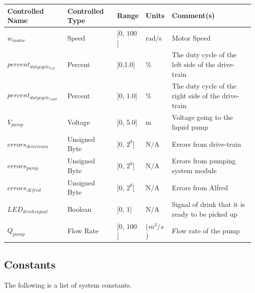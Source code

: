 \documentclass [10pt]{article}
\begin{document}
\begin{longtable}{|l|l|l|l|l|}\hline 
	\rowcolor{tableCell}\textbf{Controlled Name} & \textbf{Controlled Type} & \textbf{Range} & \textbf{Units} & \textbf{Comment(s)} \\ \hline
    $w_{motor}$ & Speed & [0, $ 100 $]& rad/s &  Motor Speed\\ \hline
    	\rowcolor{tableCell}$ percent_{dutycycle_{left}} $ & Percent & [0,1.0] & \% & The duty cycle of the left side of the drive-train \\ \hline
    $ percent_{dutycycle_{right}} $ & Percent & [0, 1.0]& \% & The duty cycle of the right side of the drive-train\\ \hline
   \rowcolor{tableCell} $  V_{pump} $ & Voltage & [0, 5.0]& m &  Voltage going to the liquid pump \\ \hline
	$ errors_{drivetrain} $ & Unsigned Byte & [0, $2^{8}$]& N/A & Errors from drive-train \\ \hline
	\rowcolor{tableCell}$  errors_{pump} $ & Unsigned Byte & [0, $2^{8}$]& N/A & Errors from pumping system module \\ \hline
	$  errors_{Alfred} $ & Unsigned Byte & [0, $2^{8}$]& N/A & Errors from Alfred \\ \hline
	\rowcolor{tableCell}$LED_{drinksignal}$ & Boolean & [0, 1]& N/A & Signal of drink that it is ready to be picked up \\ \hline
	$Q_{pump}$ & Flow Rate & [0, $ 100 $]& ($m^3/s$) &  Flow rate of the pump\\ \hline
\end{longtable}



\subsection{Constants}

The following is a list of system constants. \\
\end{document}
